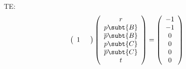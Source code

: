 \documentclass{article}
\begin{document}
TE:
$$
\left(\begin{array}{cccccc}
1 & 
\end{array}\right)
\left(\begin{array}{c}r \\ p\subt{B} \\ \overline{p}\subt{B} \\
                           p\subt{C} \\ \overline{p}\subt{C} \\ t
\end{array}\right)
=
\left(\begin{array}{c}-1 \\ -1 \\ 0 \\ 0 \\ 0 \\ 0 
\end{array}\right)
$$
\end{document}
